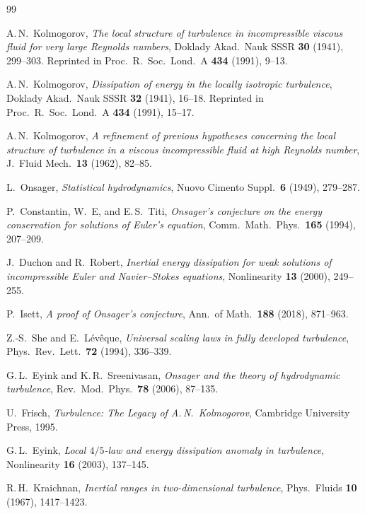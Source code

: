 \documentclass[12pt,a4paper]{article}
\theoremstyle{definition}
\theoremstyle{plain}
\theoremstyle{remark}
\begin{document}
\begin{thebibliography}{99}

A.\,N.~Kolmogorov,
\emph{The local structure of turbulence in incompressible viscous fluid
for very large Reynolds numbers},
Doklady Akad.\ Nauk SSSR \textbf{30} (1941), 299--303.
Reprinted in Proc.\ R.\ Soc.\ Lond.\ A \textbf{434} (1991), 9--13.

A.\,N.~Kolmogorov,
\emph{Dissipation of energy in the locally isotropic turbulence},
Doklady Akad.\ Nauk SSSR \textbf{32} (1941), 16--18.
Reprinted in Proc.\ R.\ Soc.\ Lond.\ A \textbf{434} (1991), 15--17.

A.\,N.~Kolmogorov,
\emph{A refinement of previous hypotheses concerning the local structure
of turbulence in a viscous incompressible fluid at high Reynolds number},
J.~Fluid Mech.\ \textbf{13} (1962), 82--85.

L.~Onsager,
\emph{Statistical hydrodynamics},
Nuovo Cimento Suppl.\ \textbf{6} (1949), 279--287.

P.~Constantin, W.~E, and E.\,S.~Titi,
\emph{Onsager's conjecture on the energy conservation for solutions of
Euler's equation},
Comm.\ Math.\ Phys.\ \textbf{165} (1994), 207--209.

J.~Duchon and R.~Robert,
\emph{Inertial energy dissipation for weak solutions of incompressible
Euler and Navier--Stokes equations},
Nonlinearity \textbf{13} (2000), 249--255.

P.~Isett,
\emph{A proof of Onsager's conjecture},
Ann.\ of Math.\ \textbf{188} (2018), 871--963.

Z.-S.~She and E.~L\'ev\^eque,
\emph{Universal scaling laws in fully developed turbulence},
Phys.\ Rev.\ Lett.\ \textbf{72} (1994), 336--339.

G.\,L.~Eyink and K.\,R.~Sreenivasan,
\emph{Onsager and the theory of hydrodynamic turbulence},
Rev.\ Mod.\ Phys.\ \textbf{78} (2006), 87--135.

U.~Frisch,
\emph{Turbulence: The Legacy of A.\,N.\ Kolmogorov},
Cambridge University Press, 1995.

G.\,L.~Eyink,
\emph{Local $4/5$-law and energy dissipation anomaly in turbulence},
Nonlinearity \textbf{16} (2003), 137--145.

R.\,H.~Kraichnan,
\emph{Inertial ranges in two-dimensional turbulence},
Phys.\ Fluids \textbf{10} (1967), 1417--1423.


\end{thebibliography}
\end{document}
